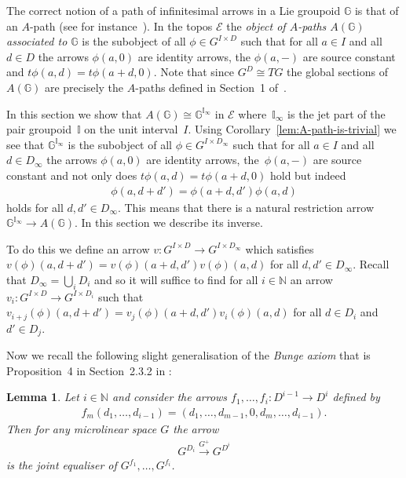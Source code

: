 \documentclass[10pt,a4paper]{amsart}
\numberwithin{equation}{section}
\newtheorem{Lemma}[Theorem]{Lemma}
\begin{document}
The correct notion of a path of inf\/initesimal arrows in a Lie groupoid $\mathbb{G}$ is that of an $A$-path (see for instance~\cite{MR1973056}). In the topos $\mathcal{E}$ the \emph{object of $A$-paths $A(\mathbb{G})$ associated to $\mathbb{G}$} is the subobject of all $\phi\in G^{I\times D}$ such that for all $a\in I$ and all $d\in D$ the arrows $\phi(a,0)$ are identity arrows, the $\phi(a,-)$ are source constant and $t\phi(a,d)=t\phi(a+d,0)$. Note that since $G^D\cong TG$ the global sections of~$A(\mathbb{G})$ are precisely the $A$-paths def\/ined in Section~1 of~\cite{MR1973056}.

In this section we show that $A(\mathbb{G})\cong \mathbb{G}^{\mathbb{I}_{\infty}}$ in $\mathcal{E}$ where~$\mathbb{I}_{\infty}$ is the jet part of the pair groupoid~$\mathbb{I}$ on the unit interval~$I$. Using Corollary~\ref{lem:A-path-is-trivial} we see that $\mathbb{G}^{\mathbb{I}_{\infty}}$ is the subobject of all $\phi\in G^{I\times D_{\infty}}$ such that for all $a\in I$ and all $d\in D_{\infty}$ the arrows $\phi(a,0)$ are identity arrows, the~$\phi(a,-)$ are source constant and not only does $t\phi(a,d)=t\phi(a+d,0)$ hold but indeed
\begin{gather*}\phi(a,d+d')=\phi(a+d,d')\phi(a,d)\end{gather*}
holds for all $d,d'\in D_{\infty}$. This means that there is a natural restriction arrow $\mathbb{G}^{\mathbb{I}_{\infty}} \rightarrow A(\mathbb{G})$. In this section we describe its inverse.

To do this we def\/ine an arrow $v\colon G^{I\times D} \rightarrow G^{I\times D_{\infty}}$ which satisf\/ies $v(\phi)(a,d+d')=v(\phi)(a+d,d')v(\phi)(a,d)$ for all $d,d'\in D_{\infty}$. Recall that $D_{\infty}=\bigcup_i D_i$ and so it will suf\/f\/ice to f\/ind for all $i\in\mathbb{N}$ an arrow $v_i\colon G^{I\times D} \rightarrow G^{I\times D_i}$ such that $v_{i+j}(\phi)(a,d+d')=v_j(\phi)(a+d,d')v_i(\phi)(a,d)$ for all $d\in D_i$ and $d'\in D_j$.

Now we recall the following slight generalisation of the \emph{Bunge axiom} that is Proposition~4 in Section~2.3.2 in \cite{MR1385464}:

\begin{Lemma}\label{lem:bunge-axiom}
Let $i\in \mathbb{N}$ and consider the arrows $f_{1},\dots ,f_{i}\colon D^{i-1}\rightarrow D^{i}$ defined by
\begin{gather*}f_{m}(d_{1},\dots ,d_{i-1})=(d_{1},\dots ,d_{m-1},0,d_{m},\dots ,d_{i-1}).\end{gather*}
Then for any microlinear space $G$ the arrow
\begin{gather*}G^{D_{i}}\xrightarrow{G^{+}}G^{D^{i}}\end{gather*}
is the joint equaliser of $G^{f_{1}},\dots,G^{f_{i}}$.
\end{Lemma}
\end{document}
